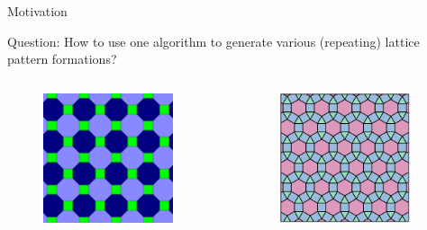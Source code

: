 \documentclass[10pt]{beamer}
\begin{document}
\begin{frame}{Motivation}{}
  \begin{block}{Question: How to use one algorithm to generate
      various (repeating) lattice pattern formations?}
    \begin{columns}
    \begin{column}{.45\textwidth}
      \begin{figure}
        \centering
        \includegraphics[height=1.5in]{figs/tessellation2.png}
      \end{figure}
    \end{column}
    \begin{column}{.45\textwidth}
       \begin{figure}
         \centering
        \includegraphics[height=1.5in]{figs/tessellation1.png}
      \end{figure}
    \end{column}
  \end{columns} 
  \end{block}
\end{frame}
\end{document}
